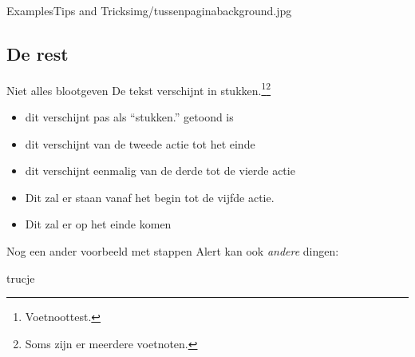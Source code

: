 \documentclass[department=none, notes={show notes}, slidesperpage=4, official=true, handout]{beamerruhuisstijl}
\begin{document}
\renewcommand{\dept}{cls}

\begin{tussenpagina}{Examples}{Tips and Tricks}{img/tussenpaginabackground.jpg}
\end{tussenpagina}
\note{}

\subsection{De rest}
\begin{frame}{Niet alles blootgeven}
    De \pause tekst \pause verschijnt \pause in \pause stukken.\footnote{Voetnoottest.}\footnote{Soms zijn er meerdere voetnoten.}

    \begin{itemize}
         \item<+-> dit verschijnt pas als ``stukken.'' getoond is
         \item<+-> dit verschijnt van de tweede actie tot het einde
         \item<+-+> dit verschijnt eenmalig van de derde tot de vierde actie
         \item<-+> Dit zal er staan vanaf het begin tot de vijfde actie.
         \item<+-> Dit zal er op het einde komen 
      \end{itemize}
\end{frame}

\begin{frame}{Nog een ander voorbeeld met stappen}
    Alert kan \alert<+->{ook}
    \emph<+->{andere} dingen:
     
    trucje
\end{frame}
\note{
    
}
\end{document}
